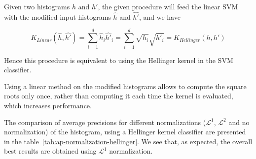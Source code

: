 \documentclass{article}
\begin{document}
Given two histograms $h$ and $h'$, the given procedure will feed the
linear SVM with the modified input histograms $\hat{h}$ and $\hat{h'}$,
and we have

\begin{equation*}
  K_{Linear}(\hat{h}, \hat{h'}) = \sum_{i = 1}^d \hat{h}_i \hat{h'}_i = \sum_{i = 1}^d \sqrt{h_i} \sqrt{h'_i} = K_{Hellinger}(h, h')
\end{equation*}

Hence this procedure is equivalent to using the Hellinger kernel in
the SVM classifier.


Using a linear method on the modified histograms allows to compute
the square roots only once, rather than computing it each time
the kernel is evaluated, which increases performance.


The comparison of average precisions for different normalizations
($\mathcal{L}^1$, $\mathcal{L}^2$ and no normalization) of the
histogram, using a Hellinger kernel classifier are presented in the
table~\ref{tab:ap-normalization-hellinger}. We see that, as expected,
the overall best results are obtained using $\mathcal{L}^1$
normalization.

\end{document}

